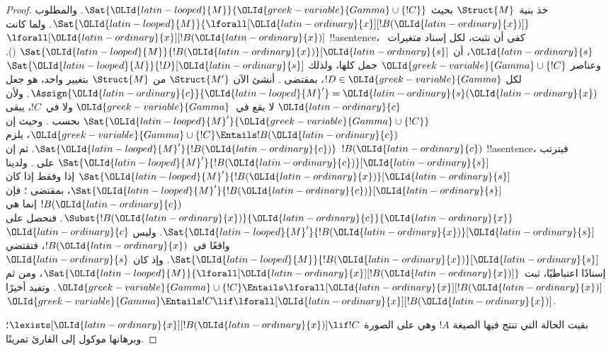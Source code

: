 \documentclass[../../../include/open-logic-section]{subfiles}
\begin{document}
\begin{proof}
{خذ بنية~$\Struct{M}$ بحيث $\Sat{\OLId{latin-looped}{M}}{\OLId{greek-variable}{Gamma} \cup \{!C\}}$. والمطلوب
$\Sat{\OLId{latin-looped}{M}}{\lforall[\OLId{latin-ordinary}{x}][!B(\OLId{latin-ordinary}{x})]}$. ولما كانت
$\lforall[\OLId{latin-ordinary}{x}][!B(\OLId{latin-ordinary}{x})]$ !!a{sentence}، كفى أن نثبت، لكل إسناد
متغيرات~$\OLId{latin-ordinary}{s}$، أن $\Sat{\OLId{latin-looped}{M}}{!B(\OLId{latin-ordinary}{x})}[\OLId{latin-ordinary}{s}]$
(). وعناصر $\OLId{greek-variable}{Gamma} \cup \{!C\}$ جمل
كلها، ولذلك $\Sat{\OLId{latin-looped}{M}}{!D}[\OLId{latin-ordinary}{s}]$ لكل $!D \in \OLId{greek-variable}{Gamma}$، بمقتضى
. أنشئ الآن $\Struct{M'}$ من
$\Struct{M}$ بتغيير واحد، هو جعل $\Assign{\OLId{latin-ordinary}{c}}{\OLId{latin-looped}{M}'} = \OLId{latin-ordinary}{s}(\OLId{latin-ordinary}{x})$. ولأن $\OLId{latin-ordinary}{c}$
لا يقع في~$\OLId{greek-variable}{Gamma}$ ولا في~$!C$، يبقى $\Sat{\OLId{latin-looped}{M}'}{\OLId{greek-variable}{Gamma} \cup \{!C\}}$
بحسب . وحيث إن $\OLId{greek-variable}{Gamma} \cup \{!C\}
\Entails !B(\OLId{latin-ordinary}{c})$، يلزم $\Sat{\OLId{latin-looped}{M}'}{!B(\OLId{latin-ordinary}{c})}$. ثم إن $!B(\OLId{latin-ordinary}{c})$ !!a{sentence}،
فيترتب $\Sat{\OLId{latin-looped}{M}'}{!B(\OLId{latin-ordinary}{c})}[\OLId{latin-ordinary}{s}]$ على
. ولدينا
$\Sat{\OLId{latin-looped}{M}'}{!B(\OLId{latin-ordinary}{x})}[\OLId{latin-ordinary}{s}]$ إذا وفقط إذا كان $\Sat{\OLId{latin-looped}{M}'}{!B(\OLId{latin-ordinary}{c})}[\OLId{latin-ordinary}{s}]$، بمقتضى
؛ فإن $!B(\OLId{latin-ordinary}{c})$ إنما هي
$\Subst{!B(\OLId{latin-ordinary}{x})}{\OLId{latin-ordinary}{c}}{\OLId{latin-ordinary}{x}}$. فنحصل على $\Sat{\OLId{latin-looped}{M}'}{!B(\OLId{latin-ordinary}{x})}[\OLId{latin-ordinary}{s}]$. وليس $\OLId{latin-ordinary}{c}$
واقعًا في~$!B(\OLId{latin-ordinary}{x})$، فتقتضي 
$\Sat{\OLId{latin-looped}{M}}{!B(\OLId{latin-ordinary}{x})}[\OLId{latin-ordinary}{s}]$. وإذ كان $\OLId{latin-ordinary}{s}$ إسنادًا اعتباطيًا، ثبت
$\Sat{\OLId{latin-looped}{M}}{\lforall[\OLId{latin-ordinary}{x}][!B(\OLId{latin-ordinary}{x})]}$، ومن ثم $\OLId{greek-variable}{Gamma} \cup \{!C\} \Entails
\lforall[\OLId{latin-ordinary}{x}][!B(\OLId{latin-ordinary}{x})]$. وتفيد  أخيرًا
$\OLId{greek-variable}{Gamma} \Entails !C \lif \lforall[\OLId{latin-ordinary}{x}][!B(\OLId{latin-ordinary}{x})]$.

بقيت الحالة التي تنتج فيها \QR{} الصيغة $!A$ وهي على الصورة
$\lexists[\OLId{latin-ordinary}{x}][!B(\OLId{latin-ordinary}{x})] \lif !C$؛ وبرهانها موكول إلى القارئ تمرينًا.}{}
\end{proof}
\end{document}
